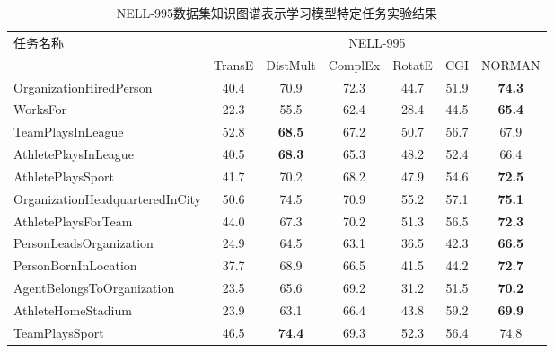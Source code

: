 \documentclass[algorithmlist, AutoFakeBold, AutoFakeSlant, figurelist, tablelist, nomlist, engineering]{seuthesix}
\begin{document}
\begin{table}[t]
  \centering
  \caption{NELL-995数据集知识图谱表示学习模型特定任务实验结果}
  \begin{tabular*}{0.95\textwidth}{@{\extracolsep{\fill}}lcccccc}
    \toprule[1pt]
    \multirow{2}{*}{\small{任务名称}} & \multicolumn{6}{c}{\small{NELL-995}} \\
      & \small{TransE} & \small{DistMult} & \small{ComplEx} & \small{RotatE} & \small{CGI} & \small{NORMAN} \\ \hline
    \small{OrganizationHiredPerson} & 40.4 & 70.9 & 72.3 & 44.7 & 51.9 & \textbf{74.3} \\
    \small{WorksFor} & 22.3 & 55.5 & 62.4 & 28.4 & 44.5 & \textbf{65.4} \\
    \small{TeamPlaysInLeague} & 52.8 & \textbf{68.5} & 67.2 & 50.7 & 56.7 & 67.9 \\
    \small{AthletePlaysInLeague} & 40.5 & \textbf{68.3} & 65.3 & 48.2 & 52.4 & 66.4 \\
    \small{AthletePlaysSport} & 41.7 & 70.2 & 68.2 & 47.9 & 54.6 & \textbf{72.5} \\
    \small{OrganizationHeadquarteredInCity} & 50.6 & 74.5 & 70.9 & 55.2 & 57.1 & \textbf{75.1} \\
    \small{AthletePlaysForTeam} & 44.0 & 67.3 & 70.2 & 51.3 & 56.5 & \textbf{72.3} \\
    \small{PersonLeadsOrganization} & 24.9 & 64.5 & 63.1 & 36.5 & 42.3 & \textbf{66.5} \\
    \small{PersonBornInLocation} & 37.7 & 68.9 & 66.5 & 41.5 & 44.2 & \textbf{72.7} \\
    \small{AgentBelongsToOrganization} & 23.5 & 65.6 & 69.2 & 31.2 & 51.5 & \textbf{70.2} \\
    \small{AthleteHomeStadium} & 23.9 & 63.1 & 66.4 & 43.8 & 59.2 & \textbf{69.9} \\
    \small{TeamPlaysSport} & 46.5 & \textbf{74.4} & 69.3 & 52.3 & 56.4 & 74.8 \\
    \bottomrule[1pt]
  \end{tabular*}
  \label{Experiment1_tasks1}
\end{table}
\end{document}

